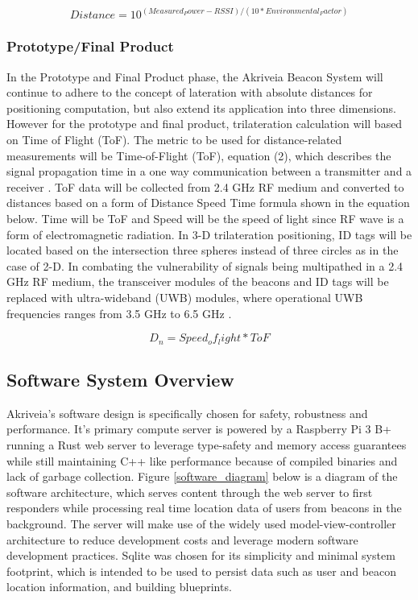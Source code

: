 \begin{equation}
    Distance = 10^{(Measured_Power - RSSI)/(10*Environmental_Factor)}
\end{equation}

\subsubsection{Prototype/Final Product}
In the Prototype and Final Product phase, the Akriveia Beacon System will continue to adhere to the concept of lateration with absolute distances for positioning computation, but also extend its application into three dimensions. However for the prototype and final product, trilateration calculation will based on Time of Flight (ToF). The metric to be used for distance-related measurements will be Time-of-Flight (ToF), equation (2), which describes the signal propagation time in a one way communication between a transmitter and a receiver \cite{R6}. ToF data will be collected from 2.4 GHz RF medium and converted to distances based on a form of Distance Speed Time formula shown in the equation below. Time will be ToF and Speed will be the speed of light since RF wave is a form of electromagnetic radiation. In 3-D trilateration positioning, ID tags will be located based on the intersection three spheres instead of three circles as in the case of 2-D. In combating the vulnerability of signals being multipathed in a 2.4 GHz RF medium, the transceiver modules of the beacons and ID tags will be replaced with ultra-wideband (UWB) modules, where operational UWB frequencies ranges from 3.5 GHz to 6.5 GHz \cite{R4}.

\begin{equation}
    D_n = Speed_of_light * ToF
\end{equation}

\break

\subsection{Software System Overview}
Akriveia's software design is specifically chosen for safety, robustness and performance. It's primary compute server is powered by a Raspberry Pi 3 B+ running a Rust web server to leverage type-safety and memory access guarantees while still maintaining C++ like performance because of compiled binaries and lack of garbage collection. Figure \ref{software_diagram} below is a diagram of the software architecture, which serves content through the web server to first responders while processing real time location data of users from beacons in the background. The server will make use of the widely used model-view-controller architecture to reduce development costs and leverage modern software development practices. Sqlite was chosen for its simplicity and minimal system footprint, which is intended to be used to persist data such as user and beacon location information, and building blueprints.

